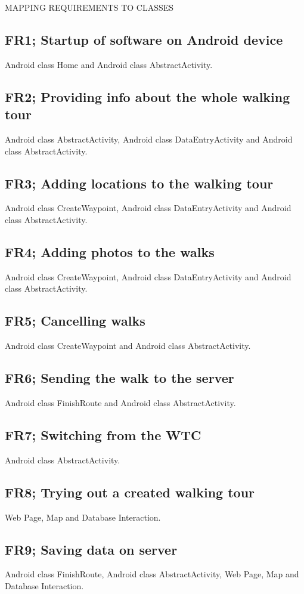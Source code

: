 \documentclass{article}
\begin{document}
	\clearpage
	\begin{section}{MAPPING REQUIREMENTS TO CLASSES}
		\subsection{FR1; Startup of software on Android device}
		Android class Home and Android class AbstractActivity.

		\subsection{FR2; Providing info about the whole walking tour}
		Android class AbstractActivity, Android class DataEntryActivity
		and Android class AbstractActivity.

		\subsection{FR3; Adding locations to the walking tour}
		Android class CreateWaypoint, Android class DataEntryActivity
		and Android class AbstractActivity.

		\subsection{FR4; Adding photos to the walks}
		Android class CreateWaypoint, Android class DataEntryActivity 
		and Android class AbstractActivity.

		\subsection{FR5; Cancelling walks}
		Android class CreateWaypoint and Android class AbstractActivity.

		\subsection{FR6; Sending the walk to the server}
		Android class FinishRoute and Android class AbstractActivity.

		\subsection{FR7; Switching from the WTC}
		Android class AbstractActivity.

		\subsection{FR8; Trying out a created walking tour}
		Web Page, Map and Database Interaction.

		\subsection{FR9; Saving data on server}
		Android class FinishRoute, Android class AbstractActivity, Web Page, Map and Database Interaction.
	\end{section}
	
\end{document}
